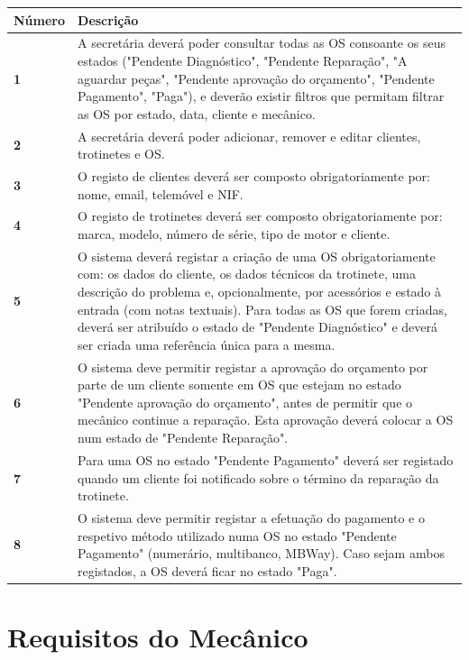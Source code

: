 \documentclass[11pt,a4paper]{article}
\begin{document}
	\begin{tabularx}{\textwidth}{@{}|l|X|@{}}
		\hline
		\rowcolor{gray!10} \textbf{Número} & \textbf{Descrição} \\ \hline
		\textbf{1} & A secretária deverá poder consultar todas as OS consoante os seus estados ("Pendente Diagnóstico", "Pendente Reparação", "A aguardar peças", "Pendente aprovação do orçamento", "Pendente Pagamento", "Paga"), e deverão existir filtros que permitam filtrar as OS por estado, data, cliente e mecânico. \\ \hline
		\textbf{2} & A secretária deverá poder adicionar, remover e editar clientes, trotinetes e OS. \\ \hline
		\textbf{3} & O registo de clientes deverá ser composto obrigatoriamente por: nome, email, telemóvel e NIF. \\ \hline
		\textbf{4} & O registo de trotinetes deverá ser composto obrigatoriamente por: marca, modelo, número de série, tipo de motor e cliente. \\ \hline
		\textbf{5} & O sistema deverá registar a criação de uma OS obrigatoriamente com: os dados do cliente, os dados técnicos da trotinete, uma descrição do problema e, opcionalmente, por acessórios e estado à entrada (com notas textuais). Para todas as OS que forem criadas, deverá ser atribuído o estado de "Pendente Diagnóstico" e deverá ser criada uma referência única para a mesma.\\ \hline
		\textbf{6} & O sistema deve permitir registar a aprovação do orçamento por parte de um cliente somente em OS que estejam no estado "Pendente aprovação do orçamento", antes de permitir que o mecânico continue a reparação. Esta aprovação deverá colocar a OS num estado de "Pendente Reparação". \\ \hline
		\textbf{7} & Para uma OS no estado "Pendente Pagamento" \space deverá ser registado quando um cliente foi notificado sobre o término da reparação da trotinete. \\ \hline
		\textbf{8} & O sistema deve permitir registar a efetuação do pagamento e o respetivo método utilizado numa OS no estado "Pendente Pagamento" (numerário, multibanco, MBWay). Caso sejam ambos registados, a OS deverá ficar no estado "Paga". \\ \hline
	\end{tabularx}
	
	\vspace{1cm}
	
	\section*{Requisitos do Mecânico}
	
\end{document}
